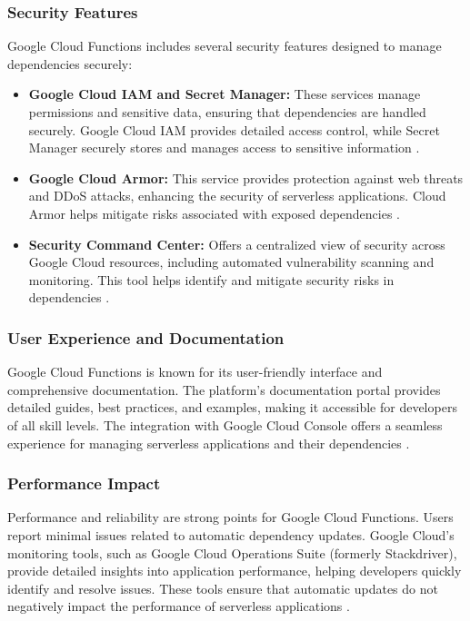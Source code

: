 \documentclass[sigconf]{acmart}
\begin{document}
\subsubsection{Security Features}

Google Cloud Functions includes several security features designed to manage dependencies securely:

\begin{itemize}
    \item \textbf{Google Cloud IAM and Secret Manager:} These services manage permissions and sensitive data, ensuring that dependencies are handled securely. Google Cloud IAM provides detailed access control, while Secret Manager securely stores and manages access to sensitive information \cite{googleSecurity2023}.
    \item \textbf{Google Cloud Armor:} This service provides protection against web threats and DDoS attacks, enhancing the security of serverless applications. Cloud Armor helps mitigate risks associated with exposed dependencies \cite{googleArmor2023}.
    \item \textbf{Security Command Center:} Offers a centralized view of security across Google Cloud resources, including automated vulnerability scanning and monitoring. This tool helps identify and mitigate security risks in dependencies \cite{googleSCC2023}.
\end{itemize}

\subsubsection{User Experience and Documentation}

Google Cloud Functions is known for its user-friendly interface and comprehensive documentation. The platform's documentation portal provides detailed guides, best practices, and examples, making it accessible for developers of all skill levels. The integration with Google Cloud Console offers a seamless experience for managing serverless applications and their dependencies \cite{googleDocs2023}.

\subsubsection{Performance Impact}

Performance and reliability are strong points for Google Cloud Functions. Users report minimal issues related to automatic dependency updates. Google Cloud's monitoring tools, such as Google Cloud Operations Suite (formerly Stackdriver), provide detailed insights into application performance, helping developers quickly identify and resolve issues. These tools ensure that automatic updates do not negatively impact the performance of serverless applications \cite{googlePerformance2023}.
\end{document}
